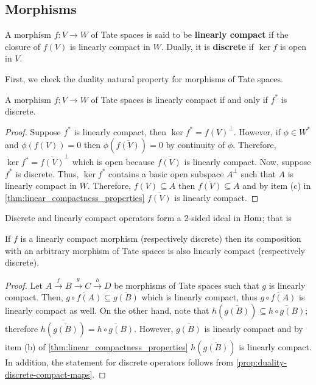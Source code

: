 \subsection{Morphisms}
\begin{definition}\label{def:linearly-compact-and-discrete-morphisms}
	A morphism $f\colon V\to W$ of Tate spaces is said to be \textbf{linearly compact} if the closure of $f(V)$ is linearly compact in $W$. Dually, it is \textbf{discrete} if $\ker f$ is open in $V$. 
\end{definition}
First, we check the duality natural property for morphisms of Tate spaces.
\begin{proposition}\label{prop:duality-discrete-compact-maps}
	A morphism $f\colon V\to W$ of Tate spaces is linearly compact if and only if $f^{*}$ is discrete.
\end{proposition}
\begin{proof}
	Suppose $f^{*}$ is linearly compact, then $\ker f^{*} = f(V)^{\perp}$. However, if $\phi\in W^{*}$ and $\phi(f(V)) = 0$ then $\phi(\overline{f(V)}) = 0$ by continuity of $\phi$. Therefore, $\ker f^{*} = \overline{f(V)}^{\perp}$ which is open because $\overline{f(V)}$ is linearly compact. Now, suppose $f^{*}$ is discrete. Thus, $\ker f^{*}$ contains a basic open subspace $A^{\perp}$ such that $A$ is linearly compact in $W$. Therefore, $f(V)\subseteq A$ then $\overline{f(V)} \subseteq A$ and by item (c) in \cref{thm:linear_compactness_properties} $\overline{f(V)}$ is linearly compact.
\end{proof}
Discrete and linearly compact operators form a 2-sided ideal in $\operatorname{Hom}$; that is
\begin{proposition}\label{prop:compact-and-discrete-2-sided-ideal}
	If $f$ is a linearly compact morphism (respectively discrete) then its composition with an arbitrary morphism of Tate spaces is also linearly compact (respectively discrete). 
\end{proposition}
\begin{proof}
	Let $A \xrightarrow{f} B \xrightarrow{g} C \xrightarrow{h} D$ be morphisms of Tate spaces such that $g$ is linearly compact. Then, $\overline{g\circ f(A)} \subseteq \overline{g(B)}$ which is linearly compact, thus $\overline{g\circ f(A)}$ is linearly compact as well. On the other hand, note that $h(\overline{g(B)}) \subseteq \overline{h\circ g(B)}$; therefore $\overline{h(\overline{g(B)})} = \overline{h\circ g(B)}$. However, $\overline{g(B)}$ is linearly compact and by item (b) of \cref{thm:linear_compactness_properties} $\overline{h(\overline{g(B)})}$ is linearly compact. In addition, the statement for discrete operators follows from \cref{prop:duality-discrete-compact-maps}.
\end{proof}
